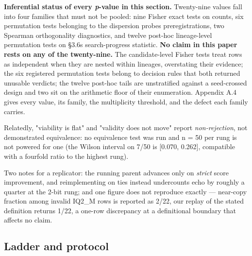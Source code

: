 \textbf{Inferential status of every \emph{p}-value in this section.} Twenty-nine values fall into four families that must not be pooled: nine Fisher exact tests on counts, six permutation tests belonging to the dispersion probes\textquotesingle{} preregistrations, two Spearman orthogonality diagnostics, and twelve post-hoc lineage-level permutation tests on §3.6\textquotesingle s search-progress statistic. \textbf{No claim in this paper rests on any of the twenty-nine.} The candidate-level Fisher tests treat rows as independent when they are nested within lineages, overstating their evidence; the six registered permutation tests belong to decision rules that both returned unusable verdicts; the twelve post-hoc tails are unstratified against a seed-crossed design and two sit on the arithmetic floor of their enumeration. Appendix A.4 gives every value, its family, the multiplicity threshold, and the defect each family carries.

Relatedly, "viability is flat" and "validity does not move" report \emph{non-rejection}, not demonstrated equivalence: no equivalence test was run and n = 50 per rung is not powered for one (the Wilson interval on 7/50 is {[}0.070, 0.262{]}, compatible with a fourfold ratio to the highest rung).

Two notes for a replicator: the running parent advances only on \emph{strict} score improvement, and reimplementing on ties instead undercounts echo by roughly a quarter at the 2-bit rung; and one figure does not reproduce exactly --- near-copy fraction among invalid IQ2\_M rows is reported as 2/22, our replay of the stated definition returns 1/22, a one-row discrepancy at a definitional boundary that affects no claim.

\hypertarget{ladder-and-protocol}{%
\subsection{Ladder and protocol}\label{ladder-and-protocol}}

